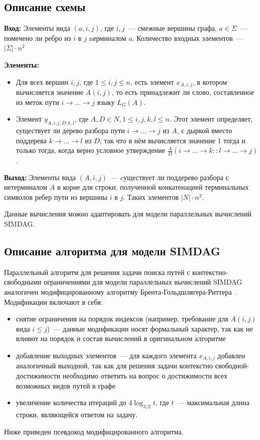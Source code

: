 \subsection {Описание схемы}
\textbf{Вход:} Элементы вида $(a, i, j)$, где $i, j$~--- смежные вершины графа, $a \in \Sigma$~--- помечено ли ребро из $i$ в $j$ nерминалом $a$. Количество входных элементов~--- $|\Sigma| \cdot n^2$

\textbf{Элементы:}
\begin{itemize}
  \item Для всех вершин $i, j$, где $1 \leq i, j \leq n$, есть элемент $x_{A, i, j}$, в котором вычисляется значение $A(i, j)$, то есть принадлежит ли слово, составленное из меток пути $i \rightarrow ... \rightarrow j$ языку $L_G(A).$
  \item Элемент $y_{A,i,j,D,k,l}$, где $A, D \in N, 1 \leq i, j, k, l \leq n $. Этот элемент определяет, существует ли дерево разбора пути $i \rightarrow ... \rightarrow j$ из $A$, с дыркой вместо поддерева $k \rightarrow ... \rightarrow l$ из $D$, так что в нём вычисляется значение 1 тогда и только тогда, когда верно условное утверждение $\frac{A}{D}(i \rightarrow... \rightarrow k :: l \rightarrow... \rightarrow j )$.
\end{itemize}
\textbf{Выход:} Элементы вида $(A, i, j)$~--- cуществует ли поддерево разбора с нетерминалом $A$ в корне для строки, полученной конкатенацией терминальных символов ребер пути из вершины $i$ в $j$. Таких элементов $|N| \cdot n^2$. 

Данные вычисления можно адаптировать для модели параллельных вычислений SIMDAG.

\subsection {Описание алгоритма для модели SIMDAG}
Параллельный алгоритм для решения задачи поиска путей с контекстно-свободными ограничениями для модели параллельных вычислений SIMDAG аналогичен модифицированному алгоритму Брента-Гольдшлягера-Риттера~\cite{Brent}. Модификации включают в себя:
\begin{itemize}
  \item снятие ограничения на порядок индексов (например, требование для $A(i, j)$ вида $i \leq j$)~--- данные модификации носят формальный характер, так как не влияют на порядок и состав вычислений в оригинальном алгоритме
  \item добавление выходных элементов~--- для каждого элемента $x_{A, i, j}$ добавлен аналогичный выходной, так как для решения задачи контекстно свободной-достижимости необходимо ответить на вопрос о достижимости всех возможных видов путей в графе
\item увеличение количества итераций до $4\log_{3/2}t$, где $t$~--- максимальная длина строки, являющейся ответом на задачу.
\end{itemize}
Ниже приведен псевдокод модифицированного алгоритма.


